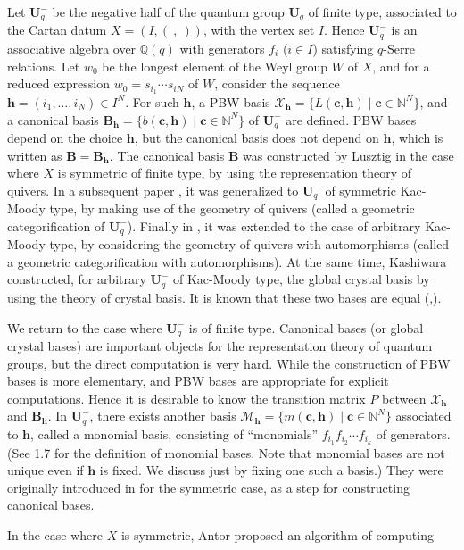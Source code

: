\documentclass[12pt]{amsart}
\renewcommand{\1}{\mathbb 1}
\newcommand{\QQ}{\mathbb Q}
\newcommand{\NN}{\mathbb N}
\newcommand\bB{\mathbf B}
\newcommand\BU{\mathbf U}
\newcommand\Bh{\mathbf h}
\newcommand\Bc{\mathbf c}
\newcommand\SM{\mathscr{M}}
\newcommand\SX{\mathscr{X}}
\numberwithin{equation}{section}
\begin{document}
Let $\BU_q^-$ be the negative half of the quantum group $\BU_q$ of finite type,
associated to the Cartan datum $X = (I, (\ ,\ ))$, with the vertex set $I$.
Hence $\BU_q^-$ is an associative algebra over $\QQ(q)$ with generators
$f_i$ ($i \in I$) satisfying $q$-Serre relations. 
Let $w_0$ be the longest element of the Weyl group $W$ of $X$, and
for a reduced expression $w_0 = s_{i_1}\cdots s_{iN}$ of $W$, consider the
sequence $\Bh = (i_1, \dots, i_N) \in I^N$.  For such $\Bh$, a PBW basis
$\SX_{\Bh} = \{ L(\Bc, \Bh) \mid \Bc \in \NN^N \}$, and a canonical basis
$\bB_{\Bh} = \{ b(\Bc, \Bh) \mid \Bc \in \NN^N\}$ of $\BU_q^-$ are defined.
PBW bases depend on the choice $\Bh$, but
the canonical basis does not depend on $\Bh$, which is written as $\bB = \bB_{\Bh}$. 
The canonical basis $\bB$ was constructed by Lusztig \cite{L-can} in the case where
$X$ is symmetric of finite type, by using the representation theory of quivers.
In a subsequent paper \cite{L-quiver}, it was generalized to $\BU_q^-$ of symmetric Kac-Moody type,
by making use of the geometry of quivers
(called a geometric categorification of $\BU_q^-$). Finally in \cite{L-book}, it was extended to
the case of arbitrary Kac-Moody type, by considering the geometry of quivers with automorphisms
(called a geometric categorification with automorphisms).
At the same time, Kashiwara \cite{Ka} constructed, for arbitrary $\BU_q^-$ of Kac-Moody type,
the global crystal basis by using the theory of crystal basis.
It is known that these two bases are equal (\cite{GL},\cite{MSZ2}). 
\par
We return to the case where $\BU_q^-$ is of finite type. 
Canonical bases (or global crystal bases) are important objects for the representation
theory of quantum groups, but the direct computation is very hard.  While the construction
of PBW bases is more elementary, and PBW bases are appropriate for explicit computations. 
Hence it is desirable to know the transition matrix $P$ between $\SX_{\Bh}$ and $\bB_{\Bh}$. 
In $\BU_q^-$, there exists another basis $\SM_{\Bh} = \{ m(\Bc, \Bh) \mid \Bc \in \NN^N\}$
associated to $\Bh$, called
a monomial basis,  consisting of ``monomials'' $f_{i_1}f_{i_2} \cdots f_{i_k}$ of generators.
(See 1.7 for the definition of monomial bases.
Note that monomial bases are not unique even if $\Bh$ is fixed.
We discuss just by fixing one such a basis.)
They were originally introduced in \cite{L-can} for the symmetric case,
as a step for constructing canonical bases.  
\par
In the case where $X$ is symmetric, Antor proposed an algorithm of computing
\end{document}
